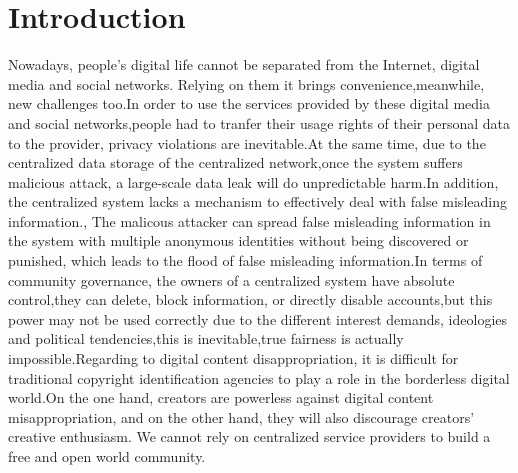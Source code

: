 \documentclass{article}
\begin{document}
\section{Introduction}\label{introduction}
    Nowadays, people's digital life cannot be separated from the Internet, digital media and social networks. Relying on them it brings convenience,meanwhile, new challenges too.In order to use the services provided by these digital media and social networks,people had to tranfer their usage rights of their personal data to the provider\cite{twitter_tos}\cite{facebook_tos}, privacy violations are inevitable.At the same time, due to the centralized data storage of the centralized network,once the system suffers malicious attack, a large-scale data leak will do unpredictable harm.In addition, the centralized system lacks a mechanism to effectively deal with false misleading information.\cite{twitter_fakenews}\cite{fb_fakenews}, The malicous attacker can spread false misleading information in the system with multiple anonymous identities without being discovered or punished, which leads to the flood of false misleading information.In terms of community governance, the owners of a centralized system have absolute control,they can delete, block information, or directly disable accounts,but this power may not be used correctly due to the different interest demands, ideologies and political tendencies,this is inevitable,true fairness is actually impossible.Regarding to digital content disappropriation, it is difficult for traditional copyright identification agencies to play a role in the borderless digital world.On the one hand, creators are powerless against digital content misappropriation, and on the other hand, they will also discourage creators' creative enthusiasm. We cannot rely on centralized service providers to build a free and open world community.
\end{document}
